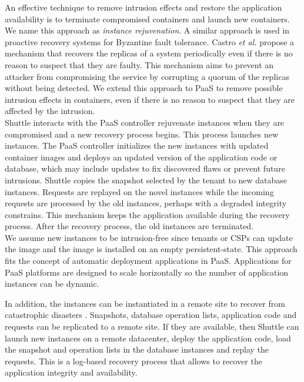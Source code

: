An effective technique to remove intrusion effects and restore the application availability is to terminate compromised containers and launch new containers. We name this approach as \textit{instance rejuvenation}. A similar approach is used in proactive recovery systems for Byzantine fault tolerance. Castro \textit{et al.} \cite{Castro2002} propose a mechanism that recovers the replicas of a system periodically even if there is no reason to suspect that they are faulty. This mechanism aims to prevent an attacker from compromising the service by corrupting a quorum of the replicas without being detected. We extend this approach to \ac{PaaS} to remove possible intrusion effects in containers, even if there is no reason to suspect that they are affected by the intrusion.\\



Shuttle interacts with the \ac{PaaS} controller rejuvenate instances when they are compromised and a new recovery process begins. This process launches new instances. The \ac{PaaS} controller initializes the new instances with updated container images and deploys an updated version of the application code or database, which may include updates to fix discovered flaws or prevent future intrusions. Shuttle copies the snapshot selected by the tenant to new database instances. Requests are replayed on the novel instances while the incoming requests are processed by the old instances, perhaps with a degraded integrity constrains. This mechanism keeps the application available during the recovery process. After the recovery process, the old instances are terminated.\\

We assume new instances to be intrusion-free since tenants or CSPs can update the image and the image is installed on an empty persistent-state. This approach fits the concept of automatic deployment applications in \ac{PaaS}. Applications for \ac{PaaS} platforms are designed to scale horizontally so the number of application instances can be dynamic.

In addition, the instances can be instantiated in a remote site to recover from catastrophic disasters \cite{cloud-disaster}. Snapshots, database operation lists, application code and requests can be replicated to a remote site. If they are available, then Shuttle can launch new instances on a remote datacenter, deploy the application code, load the snapshot and operation lists in the database instances and replay the requests. This is a log-based recovery process \cite{Wang2010} that allows to recover the  application integrity and availability.

